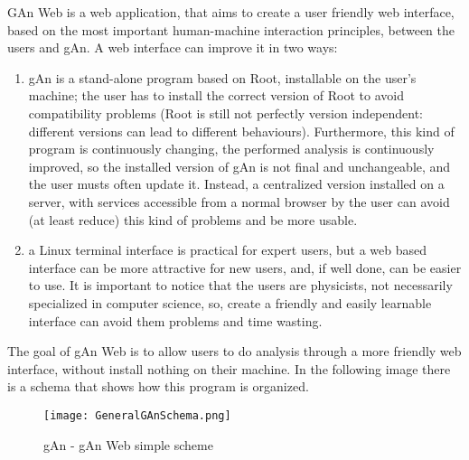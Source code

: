 GAn Web is a web application, that aims to create a user friendly web interface, based on the most important human-machine interaction principles, between the users and gAn.
A web interface can improve it in two ways:

\begin{enumerate}

\item gAn is a stand-alone program based on Root, installable on the user's machine; the user has to install the correct version of Root to avoid compatibility problems (Root is still not perfectly version independent: different versions can lead to different behaviours). Furthermore, this kind of program is continuously changing, the performed analysis is continuously improved, so the installed version of gAn is not final and unchangeable, and the user musts often update it. Instead, a centralized version installed on a server, with services accessible from a normal browser by the user can avoid (at least reduce) this kind of problems and be more usable.    
 

\item a Linux terminal interface is practical for expert users, but a web based interface can be more attractive for new users, and, if well done, can be easier to use. It is important to notice that the users are physicists, not necessarily specialized in computer science, so, create a friendly and easily learnable interface can avoid them problems and time wasting.   


\end{enumerate}


The goal of gAn Web is to allow users to do analysis through a more friendly web interface, without install nothing on their machine. In the following image there is a schema that shows how this program is organized.

\begin{figure}[H]
\centering
\texttt{[image: GeneralGAnSchema.png]} 
\caption{gAn - gAn Web simple scheme}
\end{figure}



